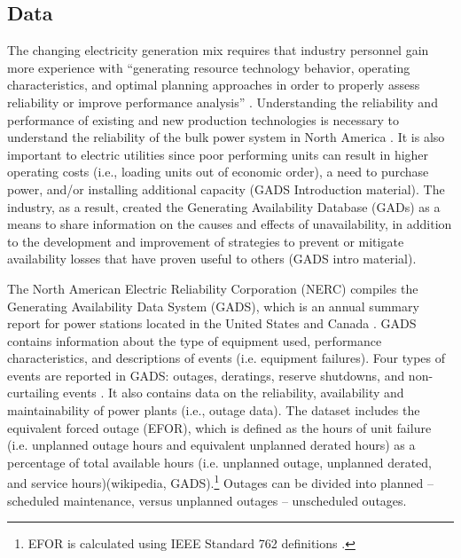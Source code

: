 \documentclass[10pt]{amsart}
\begin{document}
\subsection{Data}	
	The changing electricity generation mix requires that industry personnel gain more experience with ``generating resource technology behavior, operating characteristics, and optimal planning approaches in order to properly assess reliability or improve performance analysis'' \parencite{nerc2011gads}. 
	Understanding the reliability and performance of existing and new production technologies is necessary to understand the reliability of the bulk power system in North America \parencite{nerc2011gads}. 
	It is also important to electric utilities since poor performing units can result in higher operating costs (i.e., loading units out of economic order), a need to purchase power, and/or installing additional capacity \parencite{}(GADS Introduction material).
	The industry, as a result, created the Generating Availability Database (GADs) as a means to share information on the causes and effects of unavailability, in addition to the development and improvement of strategies to prevent or mitigate availability losses that have proven useful to others \parencite{}(GADS intro material). 
	
	The North American Electric Reliability Corporation (NERC) compiles the Generating Availability Data System (GADS), which is an annual summary report for power stations located in the United States and Canada \parencite{nercgads}. 
	GADS contains information about the type of equipment used, performance characteristics, and descriptions of events (i.e. equipment failures). 
	Four types of events are reported in GADS: outages, deratings, reserve shutdowns, and non-curtailing events \parencite{gugel2015polar}. 
	It also contains data on the reliability, availability and maintainability of power plants (i.e., outage data). 
	The dataset includes the equivalent forced outage (EFOR), which is defined as the hours of unit failure (i.e. unplanned outage hours and equivalent unplanned derated hours) as a percentage of total available hours (i.e. unplanned outage, unplanned derated, and service hours)(wikipedia, GADS).\footnote{EFOR is calculated using IEEE Standard 762 definitions \parencite{gugel2015polar}.} 
	Outages can be divided into planned -- scheduled maintenance, versus unplanned outages -- unscheduled outages. 
	
\end{document}
